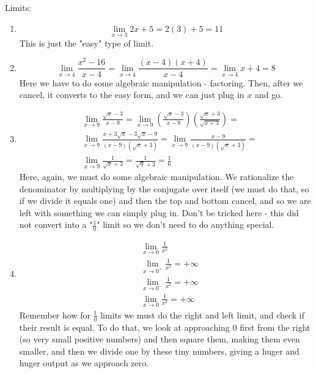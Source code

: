 \documentclass[12pt]{article}
\begin{document}
Limits:
\begin{enumerate}
\item \begin{equation*}
    \lim\limits_{x\rightarrow 3} 2x+5 = 2(3)+5 = 11
\end{equation*} This is just the "easy" type of limit.
\item \begin{equation*}
    \lim\limits_{x\rightarrow 4}\frac{x^2-16}{x-4} = \lim\limits_{x\rightarrow 4}\frac{(x-4)(x+4)}{x-4} = \lim\limits_{x\rightarrow 4}x+4 = 8
\end{equation*} Here we have to do some algebraic manipulation - factoring. Then, after we cancel, it converts to the easy form, and we can just plug in $x$ and go.
\item \begin{align*}
    & \lim\limits_{x\rightarrow 9}\frac{\sqrt{x}-3}{x-9}=  \lim\limits_{x\rightarrow 9}\left(\frac{\sqrt{x}-3}{x-9}\right) \left(\frac{\sqrt{x}+3}{\sqrt{x+3}}\right) = \\  &\lim\limits_{x\rightarrow 9} \frac{x+3\sqrt{x}-3\sqrt{x}-9}{(x-9) (\sqrt{x}+3)}=\lim\limits_{x\rightarrow 9}\frac{x-9}{(x-9)(\sqrt{x}+3)} = \\ & \lim\limits_{x\rightarrow 9}\frac{1}{\sqrt{x}+3} =\frac{1}{\sqrt{9}+3}=\frac{1}{6}
\end{align*}
Here, again, we must do some algebraic manipulation. 
We rationalize the denominator by multiplying by the conjugate over itself (we must do that, so if we divide it equals one) and then the top and bottom cancel, and so we are left with something we can simply plug in. 
Don't be tricked here - this did not convert into a "$\frac{1}{0}$" limit so we don't need to do anything special.
\item \begin{align*}
    &\lim\limits_{x\rightarrow 0} \frac{1}{x^2}\\
    &\lim\limits_{x\rightarrow 0^+} \frac{1}{x^2} = +\infty\\
    &\lim\limits_{x\rightarrow 0^-} \frac{1}{x^2} = +\infty\\
    &\lim\limits_{x\rightarrow 0} \frac{1}{x^2} = +\infty
\end{align*}
Remember how for $\frac{1}{0}$ limits we must do the right and left limit, and check if their result is equal. 
To do that, we look at approaching $0$ first from the right (so very small positive numbers) and then square them, making them even smaller, and then we divide one by these tiny numbers, giving a huger and huger output as we approach zero. 

\end{enumerate}
\end{document}
